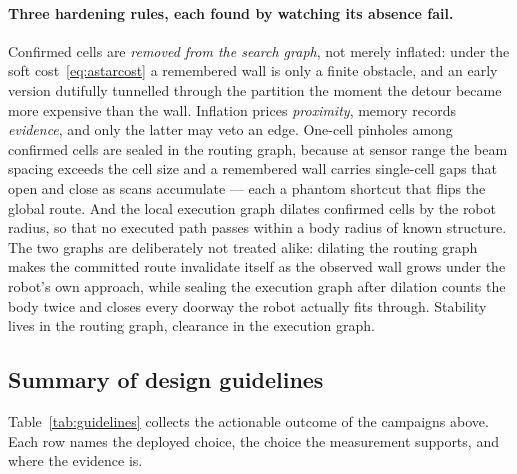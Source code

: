 \documentclass[11pt,a4paper]{article}
\begin{document}
\paragraph{Three hardening rules, each found by watching its absence fail.} Confirmed cells are
\emph{removed from the search graph}, not merely inflated: under the soft cost~\eqref{eq:astarcost} a
remembered wall is only a finite obstacle, and an early version dutifully tunnelled through the partition the
moment the detour became more expensive than the wall. Inflation prices \emph{proximity}, memory records
\emph{evidence}, and only the latter may veto an edge. One-cell pinholes among confirmed cells are sealed in
the routing graph, because at sensor range the beam spacing exceeds the cell size and a remembered wall
carries single-cell gaps that open and close as scans accumulate --- each a phantom shortcut that flips the
global route. And the local execution graph dilates confirmed cells by the robot radius, so that no executed
path passes within a body radius of known structure. The two graphs are deliberately not treated alike:
dilating the routing graph makes the committed route invalidate itself as the observed wall grows under the
robot's own approach, while sealing the execution graph after dilation counts the body twice and closes every
doorway the robot actually fits through. Stability lives in the routing graph, clearance in the execution
graph.

\subsection{Summary of design guidelines}
\label{sec:guidelines}

Table~\ref{tab:guidelines} collects the actionable outcome of the campaigns above. Each row names the
deployed choice, the choice the measurement supports, and where the evidence is.
\end{document}
